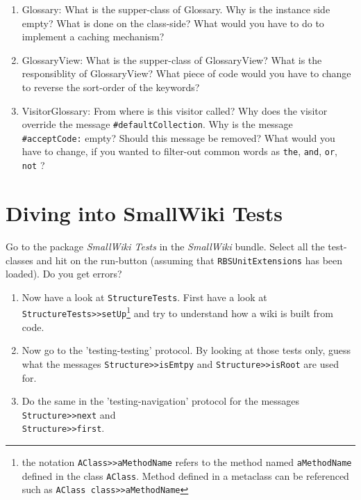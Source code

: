 \begin{enumerate}

\item Glossary: What is the supper-class of Glossary. Why is the
instance side empty? What is done on the class-side? What would
you have to do to implement a caching mechanism?

\item GlossaryView: What is the supper-class of GlossaryView? What is the responsiblity of GlossaryView? What piece of code would you have to change to reverse the sort-order of the keywords?

\item VisitorGlossary: From where is this visitor called? Why does the visitor override the message \texttt{\#defaultCollection}. Why is the message \texttt{\#acceptCode:} empty? Should this message be removed? What would you have to change, if you wanted to filter-out common words as \texttt{the}, \texttt{and}, \texttt{or}, \texttt{not} ?
\end{enumerate}


\section{Diving into SmallWiki Tests}

\exercise Go to the package \textit{SmallWiki Tests} in the
\textit{SmallWiki} bundle. Select all the test-classes and hit on
the run-button (assuming that \texttt{RBSUnitExtensions} has been
loaded). Do you get errors?

\begin{enumerate}
\item Now have a look at \texttt{StructureTests}. First have a
look at \texttt{StructureTests>>setUp}\footnote{the notation
\texttt{AClass>>aMethodName} refers to the method named
\texttt{aMethodName} defined in the class \texttt{AClass}. Method
defined in a metaclass can be referenced such as \texttt{AClass
class>>aMethodName}} and try to understand how a wiki is built
from code.

\item Now go to the 'testing-testing' protocol. By looking at those tests only, guess what the messages \texttt{Structure>>isEmtpy} and \texttt{Structure>>isRoot} are used for.

\item Do the same in the 'testing-navigation' protocol for the
messages \texttt{Structure>>next} and \\ \texttt{Structure>>first}.
\end{enumerate}

